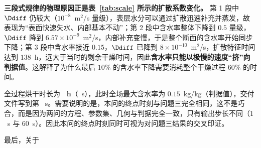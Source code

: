 \textbf{三段式规律的物理原因正是表~\ref{tab:scale} 所示的扩散系数变化。} 第 1 段中 $\Ddiff$ 仍较大（$10^{-8}$~m$^2$/s 量级），表层水分可以通过扩散迅速补充并蒸发，故表现为``表面快速失水、内部基本不动''；第 2 段中含水率整体下降到 $0.5$ 量级，$\Ddiff$ 降到 $6.57\times10^{-9}$~m$^2$/s，内部补充变慢，于是整个断面的含水率开始同步下降；第 3 段中含水率接近 $0.15$，$\Ddiff$ 已降到 $8\times10^{-10}$~m$^2$/s，扩散特征时间达到 $138$~h，远大于当时的剩余干燥时间，因此\textbf{含水率只能以极慢的速度``挤''向判据值}。这解释了为什么最后 $10\%$ 的含水率下降需要消耗整个干燥过程 $60\%$ 的时间。

全过程烘干时长为 \textbf{\QTwoEventH~h}（\QTwoEventS~s），此时全场最大含水率为 $0.15$~kg/kg（判据值），交付文件写到第 \QTwoLastRowS~s。需要说明的是，本问的终点时刻与问题三完全相同，这不是巧合，而是因为两问的方程、参数集、几何与判据完全一致，只有输出步长不同（$1$~s 与 $60$~s）。因此本问的终点时刻同时可视为对问题三结果的交叉印证。

最后，关于
